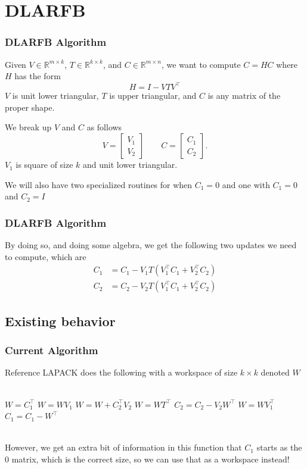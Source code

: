 \documentclass[12pt,aspectratio=169]{beamer}
\newcommand{\R}{\mathbb{R}}
\begin{document}
    \section{DLARFB}
    \begin{frame}
        \frametitle{DLARFB Algorithm}
        Given $V\in\R^{m\times k}$, $T\in\R^{k\times k}$, and $C\in\R^{m\times n}$, we 
        want to compute $C = HC$ where $H$ has the form
        $$
        H = I - VTV^\top
        $$
        $V$ is unit lower triangular, $T$ is upper triangular, 
        and $C$ is any matrix of the proper shape. 

        We break up $V$ and $C$ as follows
        $$
            V = \begin{bmatrix}
                V_1\\
                V_2
            \end{bmatrix} \qquad
            C = \begin{bmatrix}
                C_1\\
                C_2
            \end{bmatrix}.
        $$
        $V_1$ is square of size $k$ and unit lower triangular.

        We will also have two specialized routines for when $C_1 = 0$ and one with $C_1=0$ and $C_2=I$
    \end{frame}
    \begin{frame}
        \frametitle{DLARFB Algorithm}
        By doing so, and doing some algebra, we get the following two updates we need to compute, which are
        \begin{align*}
            C_1 &= C_1 - V_1T\left(V_1^\top C_1 + V_2^\top C_2\right) \\
            C_2 &= C_2 - V_2T\left(V_1^\top C_1 + V_2^\top C_2\right)
        \end{align*}
    \end{frame}
    \subsection{Existing behavior}
    \begin{frame}
        \frametitle{Current Algorithm}
        Reference LAPACK does the following with a workspace of size $k\times k$ denoted $W$\\\,\\
        \begin{algorithmic}[1]
            \State $W = C_1^\top$
            \State $W = WV_1$
            \State $W = W + C_2^\top V_2$
            \State $W = WT^\top$
            \State $C_2 = C_2 - V_2W^\top$
            \State $W = WV_1^\top$
            \State $C_1 = C_1 - W^\top$
        \end{algorithmic}\,\\
        However, we get an extra bit of information in this function that $C_1$ starts as the $0$ matrix, which is the correct
        size, so we can use that as a workspace instead!
    \end{frame}
\end{document}
